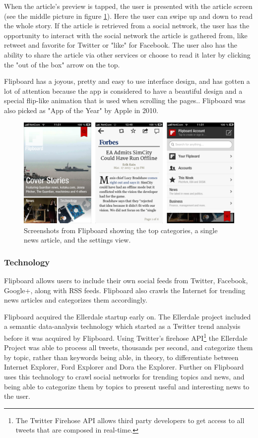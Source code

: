 When the article's preview is tapped, the user is presented with the article screen (see the middle picture in figure \ref{screenshots_flipboard}). Here the user can swipe up and down to read the whole story. If the article is retrieved from a social network, the user has the opportunity to interact with the social network the article is gathered from, like retweet and favorite for Twitter or "like" for Facebook. The user also has the ability to share the article via other services or choose to read it later by clicking the "out of the box" arrow on the top.

Flipboard has a joyous, pretty and easy to use interface design, and has gotten a lot of attention because the app is considered to have a beautiful design\cite{flipboard_design} and a special flip-like animation that is used when scrolling the pages.\cite{flipboard_video}\cite{flipboard_animation}. Flipboard was also picked as "App of the Year" by Apple in 2010\cite{flipboard_app_of_the_year}.

\begin{figure}[!htbp]
\centering
\includegraphics[width=130mm]{GFX/screenshots/flipboard.png}
\caption{Screenshots from Flipboard showing the top categories, a single news article, and the settings view.}
\label{screenshots_flipboard}
\end{figure}

\subsubsection{Technology}
Flipboard allows users to include their own social feeds from Twitter, Facebook, Google+, along with RSS feeds. Flipboard also crawls the Internet for trending news articles and categorizes them accordingly.

Flipboard acquired the Ellerdale startup early on\cite{flipboard_acquired_ellerdale}. The Ellerdale project included a semantic data-analysis technology which started as a Twitter trend analysis before it was acquired by Flipboard. Using Twitter's firehose API\footnote{The Twitter Firehose API allows third party developers to get access to all tweets that are composed in real-time.} the Ellerdale Project was able to process all tweets, thousands per second, and categorize them by topic, rather than keywords\cite{flipboard_categorize_by_topic} being able, in theory, to differentiate between Internet Explorer, Ford Explorer and Dora the Explorer. Further on Flipboard uses this technology to crawl social networks for trending topics and news, and being able to categorize them by topics to present useful and interesting news to the user.

